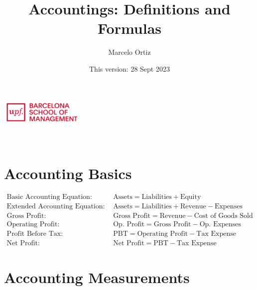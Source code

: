 \documentclass[12pt]{article}
\title{Accountings: Definitions and  Formulas}
\author{Marcelo Ortiz}
\date{This version: 28 Sept 2023}
\begin{document}
\makeatletter  
\begin{center}
	\includegraphics[width=0.3\textwidth]{logo.png}\\[1em]  %
	{\LARGE \textbf{\@title}}\\[1em]  %
	{\large \@author}\\[1em]  %
	{\@date}  %
\end{center}
\makeatother  %

\section{Accounting Basics}
	\begin{tcolorbox}
	\begin{align*}
		\text{Basic Accounting Equation:} \quad & \text{Assets} = \text{Liabilities} + \text{Equity} \\
		\text{Extended Accounting Equation:} \quad & \text{Assets} = \text{Liabilities} + \text{Revenue}- \text{Expenses} \\
		\text{Gross Profit:} \quad & \text{Gross Profit} = \text{Revenue} - \text{Cost of Goods Sold} \\
		\text{Operating Profit:} \quad & \text{Op. Profit} = \text{Gross Profit} - \text{Op. Expenses} \\
		\text{Profit Before Tax:} \quad & \text{PBT} = \text{Operating Profit} - \text{Tax Expense} \\
		\text{Net Profit:} \quad & \text{Net Profit} = \text{PBT} - \text{Tax Expense}
	\end{align*}
	\end{tcolorbox}

\section{Accounting Measurements}
\end{document}
